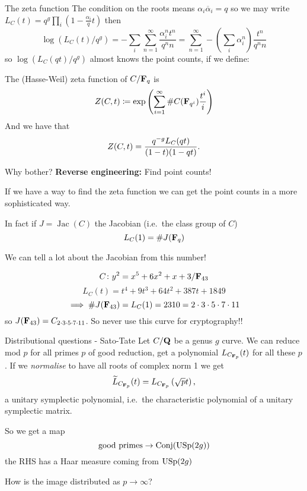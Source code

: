 \begin{frame}{The zeta function}
    The condition on the roots means $\alpha_i \overline \alpha_i = q$ so we may write $L_C(t) = q^g\prod_i (1-\frac{\alpha_i }{q}t)$ then
    \[\log(L_C(t)/q^g) = -\sum_i \sum_{n=1}^\infty \frac{\alpha_i^n t^n}{q^n n}  = \sum_{n=1}^\infty -\left(\sum_i \alpha_i^n\right) \frac{t^n}{q^n n}\]
    so \(\log(L_C(qt)/q^g)\) almost knows the point counts\pause, if we define:

    \begin{definition}
        The (Hasse-Weil) zeta function of $C/\mathbf F_q$ is
        \[ Z(C, t) \coloneqq \exp\left(\sum_{i=1}^\infty \#C(\mathbf F_{q^i}) \frac{t^i}{i}\right) \]
    \pause
    And we have that \[Z(C,t) = \frac{q^{-g}L_C(qt)}{(1-t)(1-qt)}\text.\]
    \end{definition}
\end{frame}

\begin{frame}{Why bother?}
    \textbf{Reverse engineering:}
    Find point counts!

    If we have a way to find the zeta function we can get the point counts in a more sophisticated way.\pause

    In fact if \(J =\operatorname{Jac}(C)\) the Jacobian (i.e.\ the class group of \(C\))
    \[ L_C(1) = \# J(\mathbf F_q)\]

    We can tell a lot about the Jacobian from this number!\pause

    \begin{example}
        \[C \colon y^2 = x^5 + 6x^2 + x + 3/\mathbf F_{43}\]
        \[L_C(t) = t^4 + 9t^3 + 64t^2 + 387t + 1849\]
        \[ \implies\#J(\mathbf F_{43}) = L_C(1) = 2310 = 2 \cdot 3 \cdot 5 \cdot 7 \cdot 11\]
        so \(J(\mathbf F_{43}) = C_{2 \cdot 3 \cdot 5 \cdot 7 \cdot 11}\).  \pause
        So never use this curve for cryptography!!
    \end{example}
\end{frame}

\begin{frame}{Distributional questions - Sato-Tate}
    Let $C/\mathbf Q$ be a genus $g$ curve. We can reduce mod $p$ for all primes $p$ of good reduction, get a polynomial $L_{C_{\mathbf F_p}}(t)$ for all these $p$. \pause
    If we \emph{normalise} to have all roots of complex norm 1 we get
    \[\widetilde L_{C_{\mathbf F_p}}(t) = L_{C_{\mathbf F_p}}\left(\sqrt{p} t\right)\text,\]
    a unitary symplectic polynomial, i.e.\ the characteristic polynomial of a unitary symplectic matrix.\pause

    So we get a map
    \[\text{good primes} \to \operatorname{Conj}(\operatorname{USp}(2g))\]
    the RHS has a Haar measure coming from $\operatorname{USp}(2g)$\pause

    How is the image distributed as $p\to \infty$?
\end{frame}


